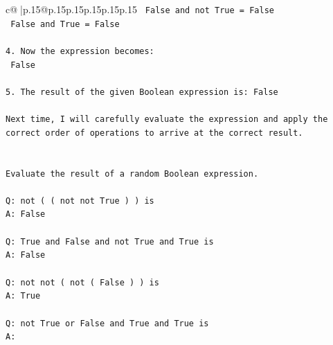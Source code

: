 \documentclass{article}
\begin{document}
{\begin{supertabular}{c@{$\;$}|p{.15\linewidth}@{}p{.15\linewidth}p{.15\linewidth}p{.15\linewidth}p{.15\linewidth}p{.15\linewidth}}
{{{\texttt{   False and not True = False} \\
\texttt{   False and True = False} \\
\\ 
\texttt{4. Now the expression becomes: } \\
\texttt{   False} \\
\\ 
\texttt{5. The result of the given Boolean expression is: False} \\
\\ 
\texttt{Next time, I will carefully evaluate the expression and apply the correct order of operations to arrive at the correct result.} \\
\\ 
\\ 
\texttt{Evaluate the result of a random Boolean expression.} \\
\\ 
\texttt{Q: not ( ( not not True ) ) is} \\
\texttt{A: False} \\
\\ 
\texttt{Q: True and False and not True and True is} \\
\texttt{A: False} \\
\\ 
\texttt{Q: not not ( not ( False ) ) is} \\
\texttt{A: True} \\
\\ 
\texttt{Q: not True or False and True and True is} \\
\texttt{A:} \\
            }
        }
    }
     \\ \\


\end{supertabular}}
\end{document}
